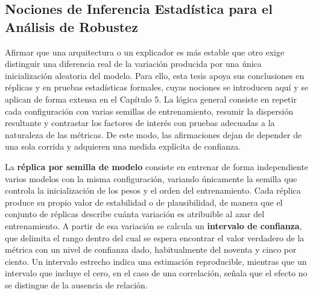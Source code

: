 \subsection{Nociones de Inferencia Estadística para el Análisis de Robustez}

Afirmar que una arquitectura o un explicador es más estable que otro exige distinguir una diferencia real de la variación producida por una única inicialización aleatoria del modelo. Para ello, esta tesis apoya sus conclusiones en réplicas y en pruebas estadísticas formales, cuyas nociones se introducen aquí y se aplican de forma extensa en el Capítulo 5. La lógica general consiste en repetir cada configuración con varias semillas de entrenamiento, resumir la dispersión resultante y contrastar los factores de interés con pruebas adecuadas a la naturaleza de las métricas. De este modo, las afirmaciones dejan de depender de una sola corrida y adquieren una medida explícita de confianza.

La \textbf{réplica por semilla de modelo} consiste en entrenar de forma independiente varios modelos con la misma configuración, variando únicamente la semilla que controla la inicialización de los pesos y el orden del entrenamiento. Cada réplica produce su propio valor de estabilidad o de plausibilidad, de manera que el conjunto de réplicas describe cuánta variación es atribuible al azar del entrenamiento. A partir de esa variación se calcula un \textbf{intervalo de confianza}, que delimita el rango dentro del cual se espera encontrar el valor verdadero de la métrica con un nivel de confianza dado, habitualmente del noventa y cinco por ciento. Un intervalo estrecho indica una estimación reproducible, mientras que un intervalo que incluye el cero, en el caso de una correlación, señala que el efecto no se distingue de la ausencia de relación.

